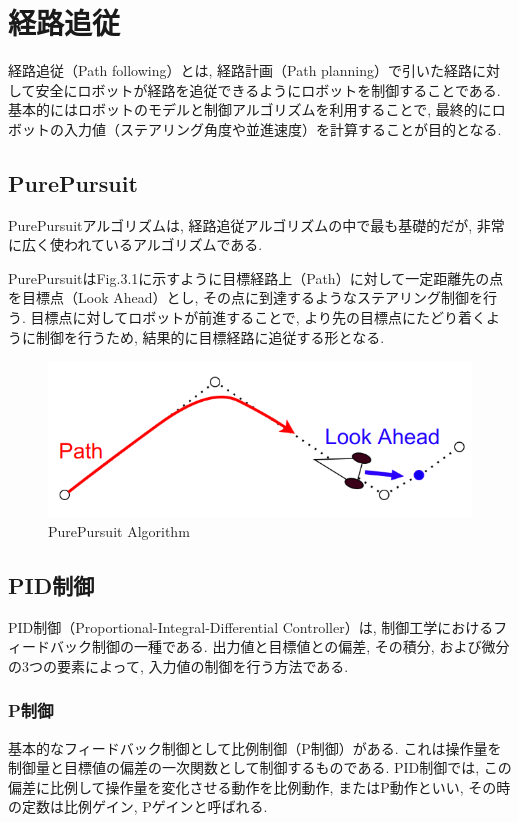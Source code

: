 
\section{経路追従}
経路追従（Path following）とは, 経路計画（Path planning）で引いた経路に対して安全にロボットが経路を追従できるようにロボットを制御することである.
基本的にはロボットのモデルと制御アルゴリズムを利用することで, 最終的にロボットの入力値（ステアリング角度や並進速度）を計算することが目的となる.

\subsection{PurePursuit}
PurePursuitアルゴリズムは, 経路追従アルゴリズムの中で最も基礎的だが, 非常に広く使われているアルゴリズムである.

PurePursuitはFig.3.1に示すように目標経路上（Path）に対して一定距離先の点を目標点（Look Ahead）とし, その点に到達するようなステアリング制御を行う.
目標点に対してロボットが前進することで, より先の目標点にたどり着くように制御を行うため, 結果的に目標経路に追従する形となる.

\begin{figure}[H]
  \centering
 \includegraphics[keepaspectratio, scale=0.5]
      {images/PurePursuit.png}
 \caption{PurePursuit Algorithm}
 \label{fig:purepursuit}
\end{figure}

\subsection{PID制御}
PID制御（Proportional-Integral-Differential Controller）は, 制御工学におけるフィードバック制御の一種である.
出力値と目標値との偏差, その積分, および微分の3つの要素によって, 入力値の制御を行う方法である.

\subsubsection{P制御}
基本的なフィードバック制御として比例制御（P制御）がある.
これは操作量を制御量と目標値の偏差の一次関数として制御するものである.
PID制御では, この偏差に比例して操作量を変化させる動作を比例動作, またはP動作といい, その時の定数は比例ゲイン, Pゲインと呼ばれる.

